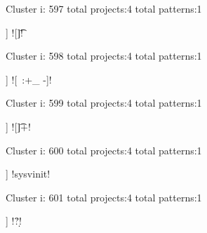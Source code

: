 Cluster i: 597
total projects:4
total patterns:1
\begin{multicols}{1}
\begin{description}[noitemsep,topsep=0pt]
\item [[4] ] \cverb![\n\t]!
\end{description}
\end{multicols}







Cluster i: 598
total projects:4
total patterns:1
\begin{multicols}{1}
\begin{description}[noitemsep,topsep=0pt]
\item [[4] ] \cverb![~:+_ -]!
\end{description}
\end{multicols}







Cluster i: 599
total projects:4
total patterns:1
\begin{multicols}{1}
\begin{description}[noitemsep,topsep=0pt]
\item [[4] ] \cverb![\t ]+\n!
\end{description}
\end{multicols}







Cluster i: 600
total projects:4
total patterns:1
\begin{multicols}{1}
\begin{description}[noitemsep,topsep=0pt]
\item [[4] ] \cverb!sysvinit!
\end{description}
\end{multicols}







Cluster i: 601
total projects:4
total patterns:1
\begin{multicols}{1}
\begin{description}[noitemsep,topsep=0pt]
\item [[4] ] \cverb!\r?\n\d!
\end{description}
\end{multicols}







